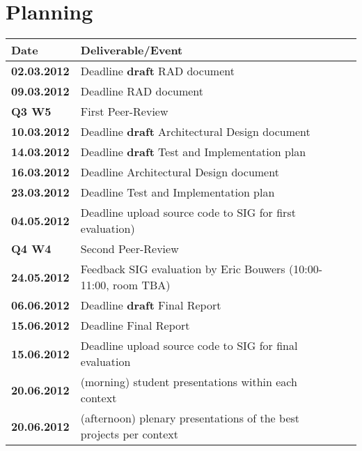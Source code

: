 \documentclass[a4paper]{article}
\begin{document}


\pagebreak
\section{Planning}  %
\begin{tabular}{llll}
\textbf{Date}   &Deliverable/Event\\\hline
\textbf{02.03.2012}      &Deadline \textbf{draft} RAD document\\\hline
\textbf{09.03.2012}      &Deadline RAD document\\\hline
\textbf{Q3 W5}           &First Peer-Review\\\hline
\textbf{10.03.2012 }     &Deadline \textbf{draft} Architectural Design document\\\hline
\textbf{14.03.2012 }     &Deadline \textbf{draft} Test and Implementation plan\\\hline
\textbf{16.03.2012 }     &Deadline Architectural Design document\\\hline
\textbf{23.03.2012 }     &Deadline Test and Implementation plan\\\hline
\textbf{04.05.2012}      &Deadline upload source code to SIG for first evaluation)\\\hline
\textbf{Q4 W4 }          &Second Peer-Review\\\hline
\textbf{24.05.2012}      &Feedback SIG evaluation by Eric Bouwers (10:00-11:00, room TBA)\\\hline
\textbf{06.06.2012}      &Deadline \textbf{draft} Final Report\\\hline
\textbf{15.06.2012}      &Deadline Final Report\\\hline
\textbf{15.06.2012}      &Deadline upload source code to SIG for final evaluation\\\hline
\textbf{20.06.2012}      &(morning)    student presentations within each context\\\hline
\textbf{20.06.2012}      &(afternoon)  plenary presentations of the best projects per context\\\hline
\end{tabular}
\pagebreak
\end{document}
